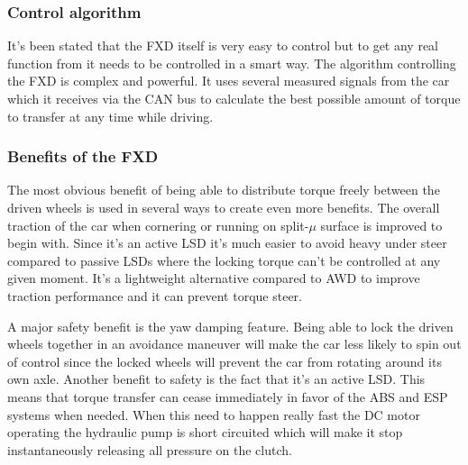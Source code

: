 \subsubsection{Control algorithm}
It's been stated that the FXD itself is very easy to control but to get any real function from it needs to be controlled in a smart way. The algorithm controlling the FXD is complex and powerful. It uses several measured signals from the car which it receives via the CAN bus to calculate the best possible amount of torque to transfer at any time while driving. 

\subsubsection{Benefits of the FXD}
The most obvious benefit of being able to distribute torque freely between the driven wheels is used in several ways to create even more benefits. The overall traction of the car when cornering or running on split-$ \mu $ surface is improved to begin with. Since it's an active LSD it's much easier to avoid heavy under steer compared to passive LSDs where the locking torque can't be controlled at any given moment. It's a lightweight alternative compared to AWD to improve traction performance and it can prevent torque steer.

A major safety benefit is the yaw damping feature. Being able to lock the driven wheels together in an avoidance maneuver will make the car less likely to spin out of control since the locked wheels will prevent the car from rotating around its own axle. Another benefit to safety is the fact that it's an active LSD. This means that torque transfer can cease immediately in favor of the ABS and ESP systems when needed. When this need to happen really fast the DC motor operating the hydraulic pump is short circuited which will make it stop instantaneously releasing all pressure on the clutch. 
